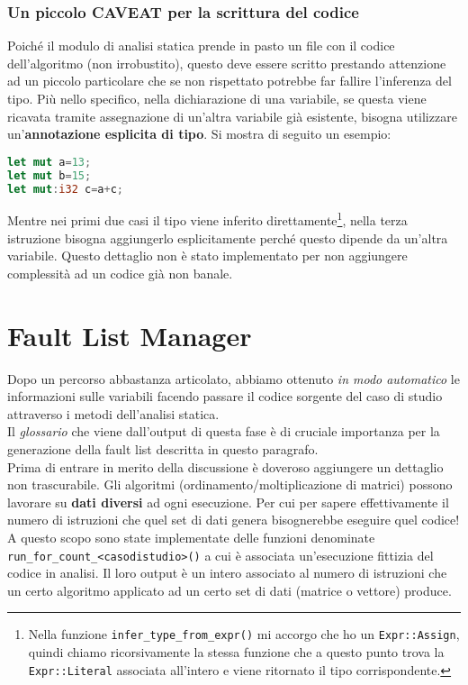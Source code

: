 \subsubsection{Un piccolo CAVEAT per la scrittura del codice}
Poiché il modulo di analisi statica prende in pasto un file con il codice dell'algoritmo (non irrobustito), questo deve essere scritto prestando attenzione ad un piccolo particolare che se non rispettato potrebbe far fallire l'inferenza del tipo. Più nello specifico, nella dichiarazione di una variabile, se questa viene ricavata tramite assegnazione di un'altra variabile già esistente, bisogna utilizzare un'\textbf{annotazione esplicita di tipo}. Si mostra di seguito un esempio: 
\begin{lstlisting}[language=rust, style=boxed]
let mut a=13; 
let mut b=15; 
let mut:i32 c=a+c; 
\end{lstlisting}
Mentre nei primi due casi il tipo viene inferito direttamente\footnote{
    Nella funzione \texttt{infer\_type\_from\_expr()} mi accorgo che ho un \texttt{Expr::Assign}, quindi chiamo ricorsivamente la stessa funzione che a questo punto trova la \texttt{Expr::Literal} associata all'intero e viene ritornato il tipo corrispondente.
}, nella terza istruzione bisogna aggiungerlo esplicitamente perché questo dipende da un'altra variabile. Questo dettaglio non è stato implementato per non aggiungere complessità ad un codice già non banale.


\section{Fault List Manager}\label{sec:FLM}
Dopo un percorso abbastanza articolato, abbiamo ottenuto \textit{in modo automatico} le informazioni sulle variabili facendo passare il codice sorgente del caso di studio attraverso i metodi dell'analisi statica. \\
Il \textit{glossario} che viene dall'output di questa fase è di cruciale importanza per la generazione della fault list descritta in questo paragrafo. \\
Prima di entrare in merito della discussione è doveroso aggiungere un dettaglio non trascurabile. Gli algoritmi (ordinamento/moltiplicazione di matrici) possono lavorare su \textbf{dati diversi} ad ogni esecuzione. Per cui per sapere effettivamente il numero di istruzioni che quel set di dati genera bisognerebbe eseguire quel codice! A questo scopo sono state implementate delle funzioni denominate \texttt{run\_for\_count\_<casodistudio>()} a cui è associata  un'esecuzione fittizia del codice in analisi. Il loro output è un intero associato al numero di istruzioni che un certo algoritmo applicato ad un certo set di dati (matrice o vettore) produce.\\

